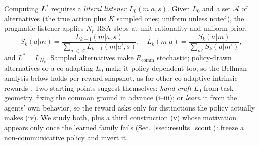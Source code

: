\documentclass[sigconf,review,anonymous]{acmart}
\newcommand{\Rcomm}{R_{\text{comm}}}
\begin{document}
Computing $L^*$ requires a \emph{literal listener} $L_0(m|a,s)$. Given $L_0$ and a set $\mathcal{A}$ of alternatives (the true action plus $K$ sampled ones; uniform unless noted), the pragmatic listener applies $N_r$ RSA steps at unit rationality and uniform prior,
\begin{equation}
S_k(a|m) = \frac{L_{k-1}(m|a,s)}{\sum_{a'\in\mathcal{A}} L_{k-1}(m|a',s)}, \quad
L_k(m|a) = \frac{S_k(a|m)}{\sum_{m'} S_k(a|m')},
\label{eq:rsa_recursion}
\end{equation}
and $L^* = L_{N_r}$. Sampled alternatives make $\Rcomm$ stochastic; policy-drawn alternatives or a co-adapting $L_0$ make it policy-dependent too, so the Bellman analysis below holds per reward snapshot, as for other co-adaptive intrinsic rewards \cite{eysenbach2019diversity}. Two starting points suggest themselves: \emph{hand-craft} $L_0$ from task geometry, fixing the common ground in advance (i--iii); or \emph{learn} it from the agents' own behavior, so the reward asks only for distinctions the policy actually makes (iv). We study both, plus a third construction (v) whose motivation appears only once the learned family fails (Sec.~\ref{ssec:results_scout}): freeze a non-communicative policy and invert it.
\end{document}

